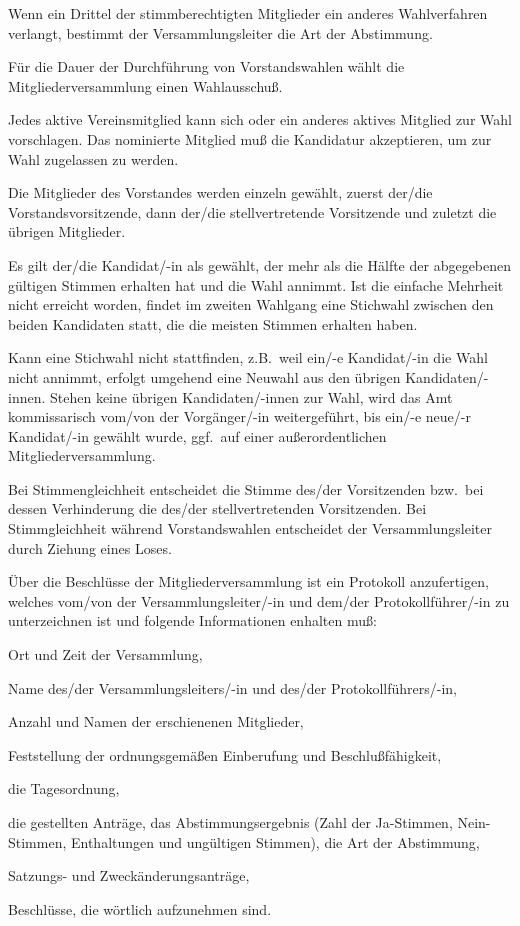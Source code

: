 \documentclass[draft]{scrartcl}
\begin{document}
\begin{contract}
Wenn ein Drittel der stimmberechtigten Mitglieder ein anderes
Wahlverfahren verlangt, bestimmt der Versammlungsleiter die Art der
Abstimmung.

Für die Dauer der Durchführung von Vorstandswahlen wählt die
Mitgliederversammlung einen Wahlausschuß.

Jedes aktive Vereinsmitglied kann sich oder ein anderes aktives Mitglied zur
Wahl vorschlagen. Das nominierte Mitglied muß die Kandidatur akzeptieren, um
zur Wahl zugelassen zu werden.

Die Mitglieder des Vorstandes werden einzeln gewählt, zuerst der/die
Vorstandsvorsitzende, dann der/die stellvertretende Vorsitzende und zuletzt
die übrigen Mitglieder.

Es gilt der/die Kandidat/-in als gewählt, der mehr als die Hälfte der
abgegebenen gültigen Stimmen erhalten hat und die Wahl annimmt. Ist die
einfache Mehrheit nicht erreicht worden, findet im zweiten Wahlgang eine
Stichwahl zwischen den beiden Kandidaten statt, die die meisten Stimmen
erhalten haben.

Kann eine Stichwahl nicht stattfinden, z.B.\ weil ein/-e Kandidat/-in die Wahl
nicht annimmt, erfolgt umgehend eine Neuwahl aus den übri\-gen
Kandidaten/-innen. Stehen keine übri\-gen Kandidaten/-innen zur Wahl, wird das
Amt kommissarisch vom/von der Vorgänger/-in weitergeführt, bis ein/-e neue/-r
Kandidat/-in gewählt wurde, ggf.\ auf einer außerordentlichen
Mitgliederversammlung.

Bei Stimmengleichheit entscheidet die Stimme des/der Vorsitzenden bzw.\ bei
dessen Verhinderung die des/der stellvertretenden Vorsitzenden. Bei
Stimmgleichheit während Vorstandswahlen entscheidet der Versammlungsleiter
durch Ziehung eines Loses.


Über die Beschlüsse der Mitgliederversammlung ist ein Protokoll anzufertigen,
welches vom/von der Versammlungsleiter/-in und dem/der Protokollführer/-in zu
unterzeichnen ist und folgende Informationen enhalten muß:
\begin{compactenum}[\hspace{2em}1.]
  \item Ort und Zeit der Versammlung,
  \item Name des/der Versammlungsleiters/-in und des/der Protokollführers/-in,
  \item Anzahl und Namen der erschienenen Mitglieder,
  \item Feststellung der ordnungsgemäßen Einberufung und Beschlußfähigkeit,
  \item die Tagesordnung,
  \item die gestellten Anträge, das Abstimmungsergebnis (Zahl der Ja-Stimmen,
    Nein-Stimmen, Enthaltungen und ungültigen Stimmen), die Art der
    Abstimmung,
  \item Satzungs- und Zweckänderungsanträge,
  \item Beschlüsse, die wörtlich aufzunehmen sind.
\end{compactenum}


\end{contract}
\end{document}
